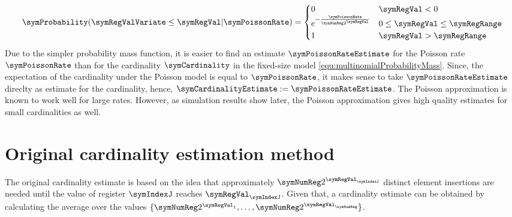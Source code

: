 \documentclass[a4paper]{scrartcl}
\begin{document}
\begin{equation}
\label{equ:register_value_distribution}
\symProbability(\symRegValVariate \leq \symRegVal\vert\symPoissonRate)
=
\begin{cases}
0 & \symRegVal < 0 \\
e^{-\frac{\symPoissonRate}{\symNumReg 2^\symRegVal}} & 0\leq \symRegVal \leq \symRegRange \\
1 & \symRegVal > \symRegRange
\end{cases}
\end{equation}
Due to the simpler probability mass function, it is easier to find an estimate  $\symPoissonRateEstimate$ for the Poisson rate $\symPoissonRate$ than for the cardinality $\symCardinality$ in the fixed-size model \eqref{equ:multinomialProbabilityMass}. Since, the expectation of the cardinality under the Poisson model is equal to $\symPoissonRate$, it makes sense to take $\symPoissonRateEstimate$ direclty as estimate for the cardinality, hence, $\symCardinalityEstimate := \symPoissonRateEstimate$. The Poisson approximation is known to work well for large rates. However, as simulation results show later, the Poisson approximation gives high quality estimates for small cardinalities as well.

\section{Original cardinality estimation method}
\label{sec:cardinality_estimation}
The original cardinality estimate \cite{Flajolet2007} is based on the idea that approximately $\symNumReg  2^{\symRegVal_\symIndexJ}$ distinct element insertions are needed until the value of register $\symIndexJ$ reaches $\symRegVal_\symIndexJ$. Given that, a cardinality estimate can be obtained by calculating the average over the values $\lbrace \symNumReg 2^{\symRegVal_1},\ldots,\symNumReg2^{\symRegVal_\symNumReg}\rbrace$. 
\end{document}
